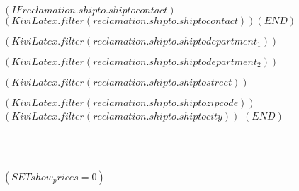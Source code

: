                  $( IF reclamation.shipto.shiptocontact )$ $( KiviLatex.filter(reclamation.shipto.shiptocontact) )$$( END )$

                 $( KiviLatex.filter(reclamation.shipto.shiptodepartment_1) )$

                 $( KiviLatex.filter(reclamation.shipto.shiptodepartment_2) )$

                 $( KiviLatex.filter(reclamation.shipto.shiptostreet) )$

                 $( KiviLatex.filter(reclamation.shipto.shiptozipcode) )$ $( KiviLatex.filter(reclamation.shipto.shiptocity) )$
$( END )$
\vspace*{1.5cm}

\hfill

\\

\ekreklamationsformel\\

\vspace{0.5cm}

$( SET show_prices = 0 )$

